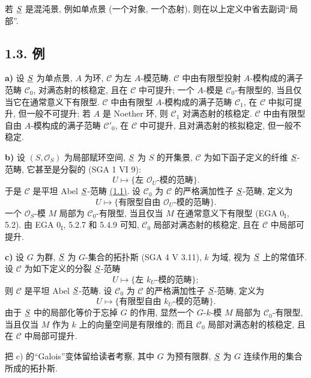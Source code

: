 若 \(\underline S\) 是混沌景, 例如单点景 (一个对象, 一个态射), 则在以上定义中省去副词“局部”.

\subsection*{1.3. 例}

\textbf{a)} 设 \(\underline S\) 为单点景, \(A\) 为环, \(\mathcal C\) 为左 \(A\)-模范畴. \(\mathcal C\) 中由有限型投射 \(A\)-模构成的满子范畴 \(\mathcal C_0\), 对满态射的核稳定, 且在 \(\mathcal C\) 中可提升; 一个 \(A\)-模是 \(\mathcal C_0\)-有限型的, 当且仅当它在通常意义下有限型. \(\mathcal C\) 中由有限型 \(A\)-模构成的满子范畴 \(\mathcal C_1\), 在 \(\mathcal C\) 中拟可提升, 但一般不可提升; 若 \(A\) 是 Noether 环, 则 \(\mathcal C_1\) 对满态射的核稳定. \(\mathcal C\) 中由有限型自由 \(A\)-模构成的满子范畴 \(\mathcal C'_0\), 在 \(\mathcal C\) 中可提升, 且对满态射的核拟稳定, 但一般不稳定.

\textbf{b)} 设 \((S,\mathcal O_{S})\) 为局部赋环空间, \(\underline S\) 为 \(S\) 的开集景, \(\mathcal C\) 为如下函子定义的纤维 \(\underline S\)-范畴, 它甚至是分裂的 (SGA 1 VI 9):
\[
  U\longmapsto \{\text{左 }\mathcal O_U\text{-模的范畴}\}.
\]
于是 \(\mathcal C\) 是平坦 Abel \(\underline S\)-范畴 \hyperlink{sga6.e01.sec.1.1}{(1.1)}. 设 \(\mathcal C_0\) 为 \(\mathcal C\) 的严格满加性子 \(\underline S\)-范畴, 定义为
\[
  U\longmapsto \{\text{有限型自由 }\mathcal O_U\text{-模的范畴}\}.
\]
一个 \(\mathcal O_{S}\)-模 \(M\) 局部为 \(\mathcal C_0\)-有限型, 当且仅当 \(M\) 在通常意义下有限型 (EGA \(0_{\mathrm I}\), 5.2). 由 EGA \(0_{\mathrm I}\), 5.2.7 和 5.4.9 可知, \(\mathcal C_0\) 局部对满态射的核稳定, 且在 \(\mathcal C\) 中局部可提升.

\textbf{c)} 设 \(G\) 为群, \(\underline S\) 为 \(G\)-集合的拓扑斯 (SGA 4 V 3.11), \(k\) 为域, 视为 \(\underline S\) 上的常值环. 设 \(\mathcal C\) 为如下定义的分裂 \(\underline S\)-范畴
\[
  U\longmapsto \{\text{左 }k_U\text{-模的范畴}\};
\]
则 \(\mathcal C\) 是平坦 Abel \(\underline S\)-范畴. 设 \(\mathcal C_0\) 为 \(\mathcal C\) 的严格满加性子 \(\underline S\)-范畴, 定义为
\[
  U\longmapsto \{\text{有限型自由 }k_U\text{-模的范畴}\}.
\]
由于 \(\underline S\) 中的局部化等价于忘掉 \(G\) 的作用, 显然一个 \(G\)-\(k\)-模 \(M\) 局部为 \(\mathcal C_0\)-有限型, 当且仅当 \(M\) 作为 \(k\) 上的向量空间是有限维的; 而且 \(\mathcal C_0\) 局部对满态射的核稳定, 且在 \(\mathcal C\) 中局部可提升.

把 c) 的“Galois”变体留给读者考察, 其中 \(G\) 为预有限群, \(\underline S\) 为 \(G\) 连续作用的集合所成的拓扑斯.

